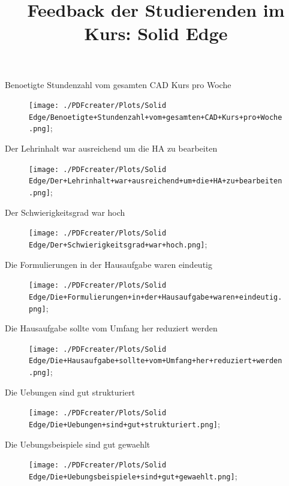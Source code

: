 \documentclass[10pt]{beamer}
\title{Feedback der Studierenden im Kurs: Solid Edge }
\begin{document}
 
     \maketitle 
\begin{frame}[fragile]{Benoetigte Stundenzahl vom gesamten CAD Kurs pro Woche} 
 \begin{figure}
 \texttt{[image: ./PDFcreater/Plots/Solid Edge/Benoetigte+Stundenzahl+vom+gesamten+CAD+Kurs+pro+Woche.png]};
 \end{figure}
 \end{frame}
\begin{frame}[fragile]{Der Lehrinhalt war ausreichend um die HA zu bearbeiten} 
 \begin{figure}
 \texttt{[image: ./PDFcreater/Plots/Solid Edge/Der+Lehrinhalt+war+ausreichend+um+die+HA+zu+bearbeiten.png]};
 \end{figure}
 \end{frame}
\begin{frame}[fragile]{Der Schwierigkeitsgrad war hoch} 
 \begin{figure}
 \texttt{[image: ./PDFcreater/Plots/Solid Edge/Der+Schwierigkeitsgrad+war+hoch.png]};
 \end{figure}
 \end{frame}
\begin{frame}[fragile]{Die Formulierungen in der Hausaufgabe waren eindeutig} 
 \begin{figure}
 \texttt{[image: ./PDFcreater/Plots/Solid Edge/Die+Formulierungen+in+der+Hausaufgabe+waren+eindeutig.png]};
 \end{figure}
 \end{frame}
\begin{frame}[fragile]{Die Hausaufgabe sollte vom Umfang her reduziert werden} 
 \begin{figure}
 \texttt{[image: ./PDFcreater/Plots/Solid Edge/Die+Hausaufgabe+sollte+vom+Umfang+her+reduziert+werden.png]};
 \end{figure}
 \end{frame}
\begin{frame}[fragile]{Die Uebungen sind gut strukturiert} 
 \begin{figure}
 \texttt{[image: ./PDFcreater/Plots/Solid Edge/Die+Uebungen+sind+gut+strukturiert.png]};
 \end{figure}
 \end{frame}
\begin{frame}[fragile]{Die Uebungsbeispiele sind gut gewaehlt} 
 \begin{figure}
 \texttt{[image: ./PDFcreater/Plots/Solid Edge/Die+Uebungsbeispiele+sind+gut+gewaehlt.png]};
 \end{figure}
 \end{frame}
\end{document}
